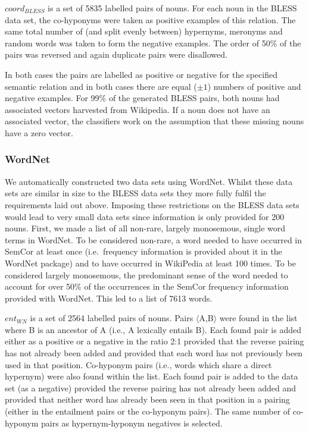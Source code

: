 \documentclass[11pt]{article}
\begin{document}
$coord_{BLESS}$ is a set of 5835 labelled pairs of nouns.  For each noun in the BLESS data set, the co-hyponyms were taken as positive examples of this relation.  The same total number of (and split evenly between) hypernyms, meronyms and random words was taken to form the negative examples.  The order of 50\% of the pairs was reversed and again duplicate pairs were disallowed. 

In both cases the pairs are labelled as positive or negative for the specified semantic relation and in both cases there are equal ($\pm 1$) numbers of positive and negative examples.  For 99\% of the generated BLESS pairs, both nouns had associated vectors harvested from Wikipedia.  If a noun does not have an associated vector, the classifiers work on the assumption that these missing nouns have a zero vector.  

\subsubsection{WordNet}

We automatically constructed two data sets using WordNet.  Whilst these data sets are similar in size to the BLESS data sets they more fully fulfil the requirements laid out above.  Imposing these restrictions on the BLESS data sets would lead to very small data sets since information is only provided for 200 nouns.  First, we made a list of all non-rare, largely monosemous, single word terms in WordNet.  To be considered non-rare, a word needed to have occurred in SemCor at least once (i.e.~frequency information is provided about it in the WordNet package) and to have occurred in WikiPedia at least 100 times.  To be considered largely monosemous, the predominant sense of the word needed to account for over 50\% of the occurrences in the SemCor frequency information provided with WordNet.  This led to a list of 7613 words. 

$ent_{WN}$ is a set of 2564 labelled pairs of nouns.  Pairs $\langle$A,B$\rangle$ were found in the list where B is an ancestor of A (i.e., A lexically entails B).  Each found pair is added either as a positive or a negative in the ratio 2:1 provided that the reverse pairing has not already been added and provided that each word has not previously been used in that position.  Co-hyponym pairs (i.e., words which share a direct hypernym) were also found within the list.  Each found pair is added to the data set (as a negative) provided the reverse pairing has not already been added and provided that neither word has already been seen in that position in a pairing (either in the entailment pairs or the co-hyponym pairs).  The same number of co-hyponym pairs as hypernym-hyponym negatives is selected. 
\end{document}
